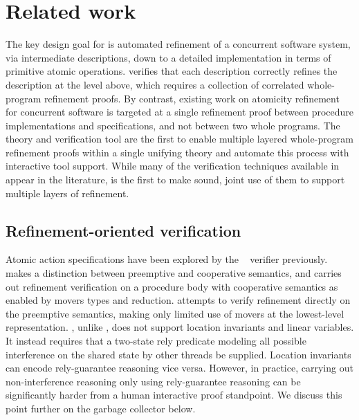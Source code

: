 
\section{Related work}
\label{sec:related}

The key design goal for \civl is automated refinement of a concurrent software system,
via intermediate descriptions, down to a detailed implementation in terms of primitive atomic operations.
\civl verifies that each description correctly refines the description
at the level above, which requires a collection of correlated
whole-program refinement proofs. 
By contrast, existing work on atomicity refinement for concurrent software is
targeted at a single refinement proof between procedure implementations and
specifications, and not between two whole programs.
The \civl theory and verification tool are the first to
enable multiple layered whole-program refinement proofs
within a single unifying theory and automate this process with
interactive tool support.
While many of the verification techniques available in \civl appear in
the literature, \civl is the first to make sound, joint use of them to
support multiple layers of refinement. 

\subsection{Refinement-oriented verification}
Atomic action specifications have been explored by the
\calvin~\cite{FlanaganFQS05,FreundQ04} verifier previously. 
\civl makes a distinction between preemptive and cooperative
semantics, and carries out refinement verification on a procedure body
with cooperative semantics as enabled by movers types and reduction.
\calvin attempts to verify refinement directly on the preemptive
semantics, making only limited use of movers at the lowest-level
representation. 
\calvin, unlike \civl, does not support location invariants and linear
variables. 
It instead requires that a two-state rely predicate modeling all possible
interference on the shared state by other threads be supplied. 
Location invariants can encode rely-guarantee reasoning vice versa. 
However, in practice, carrying out non-interference reasoning only
using rely-guarantee reasoning can be significantly harder from a
human interactive proof standpoint. We discuss this point further on
the garbage collector below. 

